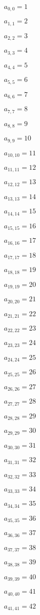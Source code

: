 \documentclass[a4paper,12pt]{article}
\begin{document}
$a _{ 0, 0 } = 1$

$a _{ 1, 1 } = 2$

$a _{ 2, 2 } = 3$

$a _{ 3, 3 } = 4$

$a _{ 4, 4 } = 5$

$a _{ 5, 5 } = 6$

$a _{ 6, 6 } = 7$

$a _{ 7, 7 } = 8$

$a _{ 8, 8 } = 9$

$a _{ 9, 9 } = 10$

$a _{ 10, 10 } = 11$

$a _{ 11, 11 } = 12$

$a _{ 12, 12 } = 13$

$a _{ 13, 13 } = 14$

$a _{ 14, 14 } = 15$

$a _{ 15, 15 } = 16$

$a _{ 16, 16 } = 17$

$a _{ 17, 17 } = 18$

$a _{ 18, 18 } = 19$

$a _{ 19, 19 } = 20$

$a _{ 20, 20 } = 21$

$a _{ 21, 21 } = 22$

$a _{ 22, 22 } = 23$

$a _{ 23, 23 } = 24$

$a _{ 24, 24 } = 25$

$a _{ 25, 25 } = 26$

$a _{ 26, 26 } = 27$

$a _{ 27, 27 } = 28$

$a _{ 28, 28 } = 29$

$a _{ 29, 29 } = 30$

$a _{ 30, 30 } = 31$

$a _{ 31, 31 } = 32$

$a _{ 32, 32 } = 33$

$a _{ 33, 33 } = 34$

$a _{ 34, 34 } = 35$

$a _{ 35, 35 } = 36$

$a _{ 36, 36 } = 37$

$a _{ 37, 37 } = 38$

$a _{ 38, 38 } = 39$

$a _{ 39, 39 } = 40$

$a _{ 40, 40 } = 41$

$a _{ 41, 41 } = 42$
\end{document}
